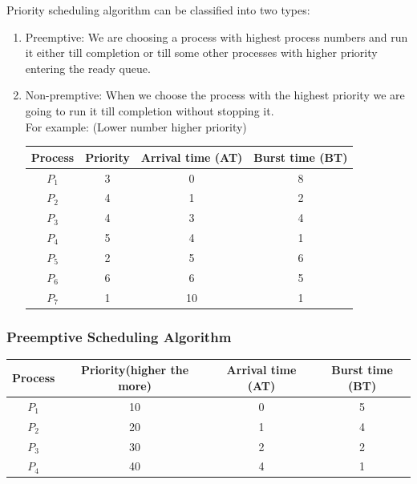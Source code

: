 \documentclass[12pt,letterpaper]{article}
\begin{document}
Priority scheduling algorithm can be classified into two types: 
\begin{enumerate}
  \item Preemptive: We are choosing a process with highest process numbers and run it either
till completion or till some other processes with higher priority entering the ready 
queue. 
  \item Non-premptive: When we choose the process with the highest priority we are going
    to run it till completion without stopping it.\\

    For example: (Lower number higher priority)
    \begin{table}[H]
      \begin{center}
        \begin{tabular}{|c|c|c|c|}
          \hline
          Process & Priority & Arrival time (AT) & Burst time (BT) \\
          \hline
          $P_1$ & 3 & 0 & 8 \\
          $P_2$ & 4 & 1 & 2\\
          $P_3$ & 4 & 3 & 4\\
          $P_4$ & 5 & 4 & 1\\
          $P_5$ & 2 & 5 & 6\\
          $P_6$ & 6 & 6 & 5\\
          $P_7$ & 1 & 10 & 1\\
          \hline
        \end{tabular}
      \end{center}
    \end{table}
\end{enumerate}

\subsubsection{Preemptive Scheduling Algorithm}
  \begin{table}[H]
    \begin{center}
      \begin{tabular}{|c|c|c|c|}
        \hline
        Process & Priority(higher the more) & Arrival time (AT) & Burst time (BT) \\
        \hline
        $P_1$ & 10 & 0 & 5 \\
        $P_2$ & 20 & 1 & 4\\
        $P_3$ & 30 & 2 & 2\\
        $P_4$ & 40 & 4 & 1\\
        \hline
      \end{tabular}
    \end{center}
  \end{table}
\end{document}
